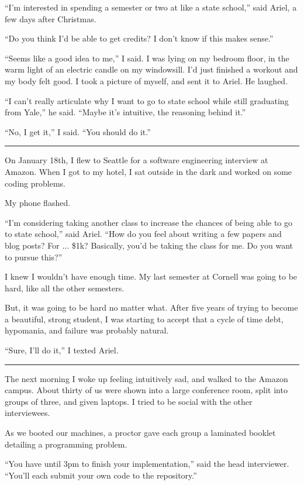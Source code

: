 ``I'm interested in spending a semester or two at like a state school,'' said
Ariel, a few days after Christmas.

``Do you think I'd be able to get credits? I don't know if this makes sense.''

``Seems like a good idea to me,'' I said. I was lying on my bedroom floor, in
the warm light of an electric candle on my windowsill. I'd just finished a
workout and my body felt good. I took a picture of myself, and sent it to Ariel.
He laughed.

``I can't really articulate why I want to go to state school while still
graduating from Yale,'' he said. ``Maybe it's intuitive, the reasoning behind
it.''

``No, I get it,'' I said. ``You should do it.''

\plainfancybreak{12pt}{2}{}

On January 18th, I flew to Seattle for a software engineering interview at
Amazon.  When I got to my hotel, I sat outside in the dark and worked on some
coding problems.

My phone flashed.

``I'm considering taking another class to increase the chances of being able to
go to state school,'' said Ariel.  ``How do you feel about writing a few papers
and blog posts?  For ... \$1k?  Basically, you'd be taking the class for me.  Do
you want to pursue this?''

I knew I wouldn't have enough time.  My last semester at Cornell was going to be
hard, like all the other semesters.

But, it was going to be hard no matter what.  After five years of trying to
become a beautiful, strong student, I was starting to accept that a cycle of
time debt, hypomania, and failure was probably natural.

``Sure, I'll do it,'' I texted Ariel.

\plainfancybreak{12pt}{2}{}

The next morning I woke up feeling intuitively sad, and walked to the Amazon
campus.  About thirty of us were shown into a large conference room, split into
groups of three, and given laptops.  I tried to be social with the other
interviewees.

As we booted our machines, a proctor gave each group a laminated booklet
detailing a programming problem.

``You have until 3pm to finish your implementation,'' said the head interviewer.
``You'll each submit your own code to the repository.''

